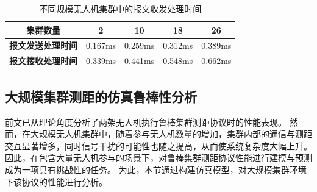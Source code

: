 \begin{table}[h]
\centering
\caption{不同规模无人机集群中的报文收发处理时间}
\label{tab:timing}
\begin{tabular}{|c|c|c|c|c|}
\hline
\textbf{集群数量} & 2   & 10  & 18  & 26  \\ \hline
\textbf{报文发送处理时间}               & 0.167ms & 0.259ms & 0.312ms & 0.389ms \\ \hline
\textbf{报文接收处理时间}               & 0.339ms & 0.441ms & 0.548ms & 0.662ms \\ \hline
\end{tabular}
\end{table}
\subsection{大规模集群测距的仿真鲁棒性分析}
\label{sec:sim_performence}

前文已从理论角度分析了两架无人机执行鲁棒集群测距协议时的性能表现。
然而，在大规模无人机集群中，随着参与无人机数量的增加，集群内部的通信与测距交互显著增多，同时信号干扰的可能性也随之提高，从而使系统复杂度大幅上升。
因此，在包含大量无人机参与的场景下，对鲁棒集群测距协议性能进行建模与预测成为一项具有挑战性的任务。
为此，本节通过构建仿真模型，对大规模集群环境下该协议的性能进行分析。

